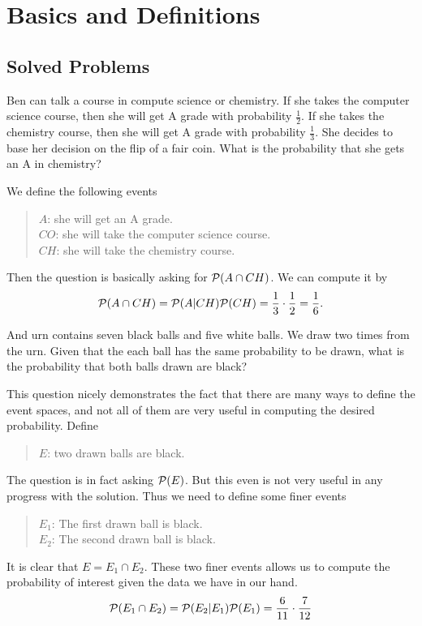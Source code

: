 \chapter{Basics and Definitions}


\section{Solved Problems}
\begin{problem}
	Ben can talk a course in compute science or chemistry. If she takes the computer science course, then she will get A grade with probability $\frac{1}{2}$. If she takes the chemistry course, then she will get A grade with probability $\frac{1}{3}$. She decides to base her decision on the flip of a fair coin. What is the probability that she gets an A in chemistry?
\end{problem}
\begin{solution}
	We define the following events
	\begin{quote}
		$A$: she will get an A grade.\\
		$CO$: she will take the computer science course.\\
		$CH$: she will take the chemistry course.
	\end{quote}
	Then the question is basically asking for $\mathcal{P}(A \cap CH)$. We can compute it by
	\[ \mathcal{P}(A \cap CH) = \mathcal{P}(A|CH)\mathcal{P}(CH) = \frac{1}{3}\cdot\frac{1}{2} = \frac{1}{6}. \]
\end{solution}

\begin{problem}
	And urn contains seven black balls and five white balls. We draw two times from the urn. Given that the each ball has the same probability to be drawn, what is the probability that both balls drawn are black?
\end{problem}
\begin{solution}
	This question nicely demonstrates the fact that there are many ways to define the event spaces, and not all of them are very useful in computing the desired probability. Define
	\begin{quote}
		$E$: two drawn balls are black.
	\end{quote}
	The question is in fact asking $\mathcal{P}(E)$. But this even is not very useful in any progress with the solution. Thus we need to define some finer events
	\begin{quote}
		$E_1$: The first drawn ball is black.\\
		$E_2$: The second drawn ball is black.
	\end{quote}
	It is clear that $E = E_1 \cap E_2$. These two finer events allows us to compute the probability of interest given the data we have in our hand.
	\[ \mathcal{P}(E_1 \cap E_2) = \mathcal{P}(E_2 | E_1) \mathcal{P}(E_1) = \frac{6}{11} \cdot \frac{7}{12} \]
	\end{solution}
	
